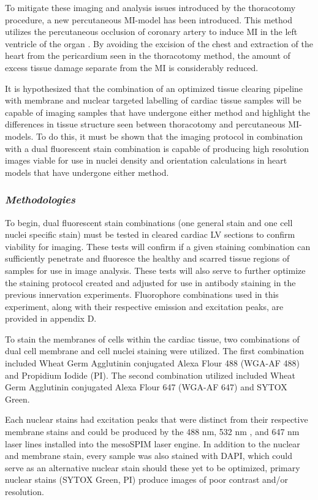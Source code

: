 To mitigate these imaging and analysis issues introduced by the thoracotomy procedure, a new percutaneous MI-model has been introduced. This method utilizes the percutaneous occlusion of coronary artery to induce MI in the left ventricle of the organ \cite{freeman_novel_2024}. By avoiding the excision of the chest and extraction of the heart from the pericardium seen in the thoracotomy method, the amount of excess tissue damage separate from the MI is considerably reduced. 

It is hypothesized that the combination of an optimized tissue clearing pipeline with membrane and nuclear targeted labelling of cardiac tissue samples will be capable of imaging samples that have undergone either method and highlight the differences in tissue structure seen between thoracotomy and percutaneous MI-models. To do this, it must be shown that the imaging protocol in combination with a dual fluorescent stain combination is capable of producing high resolution images viable for use in nuclei density and orientation calculations in heart models that have undergone either method.

\subsubsection{\textit{Methodologies}}

To begin, dual fluorescent stain combinations (one general stain and one cell nuclei specific stain) must be tested in cleared cardiac LV sections to confirm viability for imaging. These tests will confirm if a given staining combination can sufficiently penetrate and fluoresce the healthy and scarred tissue regions of samples for use in image analysis. These tests will also serve to further optimize the staining protocol created and adjusted for use in antibody staining in the previous innervation experiments. Fluorophore combinations used in this experiment, along with their respective emission and excitation peaks, are provided in appendix D.

To stain the membranes of cells within the cardiac tissue, two combinations of dual cell membrane and cell nuclei staining were utilized. The first combination included Wheat Germ Agglutinin conjugated Alexa Flour 488 (WGA-AF 488) and Propidium Iodide (PI). The second combination utilized included Wheat Germ Agglutinin conjugated Alexa Flour 647 (WGA-AF 647) and SYTOX Green. 

Each nuclear stains had excitation peaks that were distinct from their respective membrane stains and could be produced by the 488 nm, 532 nm , and 647 nm laser lines installed into the mesoSPIM laser engine. In addition to the  nuclear and membrane stain, every sample was also stained with DAPI, which could serve as an alternative nuclear stain should these yet to be optimized, primary nuclear stains (SYTOX Green, PI) produce images of poor contrast and/or resolution. 

